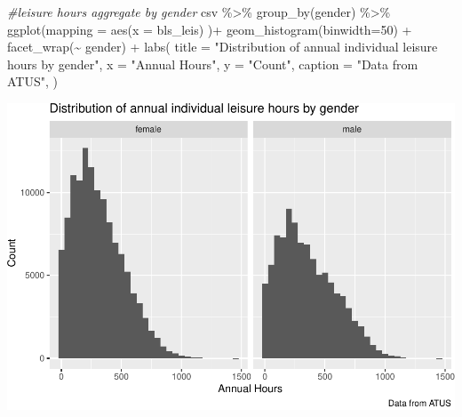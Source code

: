 \documentclass[
]{article}
\newenvironment{Shaded}{\begin{snugshade}}{\end{snugshade}}
\newcommand{\AttributeTok}[1]{\textcolor[rgb]{0.77,0.63,0.00}{#1}}
\newcommand{\CommentTok}[1]{\textcolor[rgb]{0.56,0.35,0.01}{\textit{#1}}}
\newcommand{\DecValTok}[1]{\textcolor[rgb]{0.00,0.00,0.81}{#1}}
\newcommand{\FunctionTok}[1]{\textcolor[rgb]{0.00,0.00,0.00}{#1}}
\newcommand{\NormalTok}[1]{#1}
\newcommand{\SpecialCharTok}[1]{\textcolor[rgb]{0.00,0.00,0.00}{#1}}
\newcommand{\StringTok}[1]{\textcolor[rgb]{0.31,0.60,0.02}{#1}}
\begin{document}
\begin{Shaded}
\begin{Highlighting}[]
\CommentTok{\#leisure hours aggregate by gender}
\NormalTok{csv }\SpecialCharTok{\%\textgreater{}\%}
  \FunctionTok{group\_by}\NormalTok{(gender) }\SpecialCharTok{\%\textgreater{}\%}
  \FunctionTok{ggplot}\NormalTok{(}\AttributeTok{mapping =} \FunctionTok{aes}\NormalTok{(}\AttributeTok{x =}\NormalTok{ bls\_leis) )}\SpecialCharTok{+}
  \FunctionTok{geom\_histogram}\NormalTok{(}\AttributeTok{binwidth=}\DecValTok{50}\NormalTok{) }\SpecialCharTok{+}
  \FunctionTok{facet\_wrap}\NormalTok{(}\SpecialCharTok{\textasciitilde{}}\NormalTok{ gender) }\SpecialCharTok{+}
    \FunctionTok{labs}\NormalTok{(}
  \AttributeTok{title =} \StringTok{"Distribution of annual individual leisure hours by gender"}\NormalTok{,}
  \AttributeTok{x =} \StringTok{"Annual Hours"}\NormalTok{,}
  \AttributeTok{y =} \StringTok{"Count"}\NormalTok{,}
  \AttributeTok{caption =} \StringTok{"Data from ATUS"}\NormalTok{,}
\NormalTok{)}
\end{Highlighting}
\end{Shaded}

\includegraphics{Paper2_files/figure-latex/graphs-3.pdf}
\end{document}
